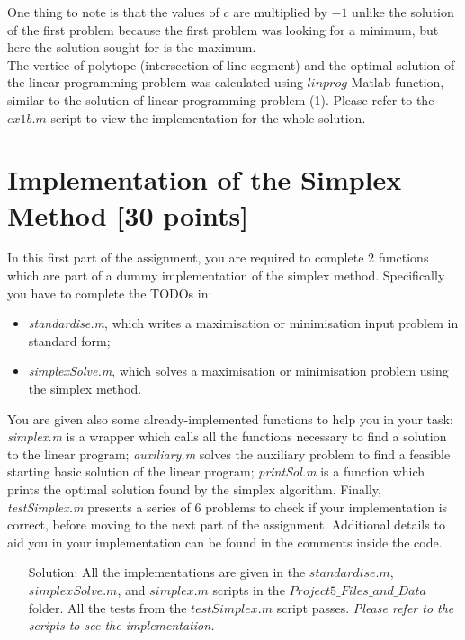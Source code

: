 \documentclass[unicode,11pt,a4paper,oneside,numbers=endperiod,openany]{scrartcl}
\begin{document}
One thing to note is that the values of ${c}$ are multiplied by ${-1}$ unlike the solution of the first problem because the first problem was looking for a minimum, but here the solution sought for is the maximum. \\

The vertice of polytope (intersection of line segment) and the optimal solution of the linear programming problem was calculated using ${linprog}$ Matlab function, similar to the solution of linear programming problem (1). Please refer to the ${ex1b.m}$ script to view the implementation for the whole solution. 


\section{Implementation of the Simplex Method [30 points]}

In this first part of the assignment, you are required to complete 2 functions which are part of a dummy implementation of the simplex method. Specifically you have to complete the TODOs in:
\begin{itemize}
	\item \emph{standardise.m}, which writes a maximisation or minimisation input problem in standard form;
	\item \emph{simplexSolve.m}, which solves a maximisation or minimisation problem using the simplex method.
\end{itemize}
You are given also some already-implemented functions to help you in your task: \emph{simplex.m} is a wrapper which calls all the functions necessary to find a solution to the linear program; \emph{auxiliary.m} solves the auxiliary problem to find a feasible starting basic solution of the linear program; \emph{printSol.m} is a function which prints the optimal solution found by the simplex algorithm. Finally, \emph{testSimplex.m} presents a series of 6 problems to check if your implementation is correct, before moving to the next part of the assignment. Additional details to aid you in your implementation can be found in the comments inside the code. \\

\begin{enumerate}
 \item[Solution:] All the implementations are given in the ${standardise.m}$, ${simplexSolve.m}$, and ${simplex.m}$ scripts in the ${Project5\_Files\_and\_Data}$ folder. All the tests from the ${testSimplex.m}$ script passes. \textit{Please refer to the scripts to see the implementation.}
\end{enumerate}
\end{document}
